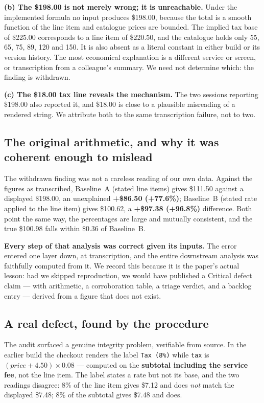 \documentclass[conference]{IEEEtran}
\begin{document}
\textbf{(b) The \$198.00 is not merely wrong; it is unreachable.} Under the implemented formula no
input produces \$198.00, because the total is a smooth function of the line item and catalogue prices
are bounded. The implied tax base of \$225.00 corresponds to a line item of \$220.50, and the catalogue
holds only 55, 65, 75, 89, 120 and 150. It is also absent as a literal constant in either build or its
version history. The most economical explanation is a different service or screen, or transcription
from a colleague's summary. We need not determine which: the finding is withdrawn.

\textbf{(c) The \$18.00 tax line reveals the mechanism.} The two sessions reporting \$198.00 also
reported it, and \$18.00 is close to a plausible misreading of a rendered string. We attribute both to
the same transcription failure, not to two.

\subsection{The original arithmetic, and why it was coherent enough to mislead}

The withdrawn finding was not a careless reading of our own data. Against the figures as transcribed,
Baseline~A (stated line items) gives \$111.50 against a displayed \$198.00, an unexplained
\textbf{+\$86.50 (+77.6\%)}; Baseline~B (stated rate applied to the line item) gives \$100.62, a
\textbf{+\$97.38 (+96.8\%)} difference. Both point the same way, the percentages are large and mutually
consistent, and the true \$100.98 falls within \$0.36 of Baseline~B.

\textbf{Every step of that analysis was correct given its inputs.} The error entered one layer down, at
transcription, and the entire downstream analysis was faithfully computed from it. We record this
because it is the paper's actual lesson: had we skipped reproduction, we would have published a
Critical defect claim --- with arithmetic, a corroboration table, a triage verdict, and a backlog
entry --- derived from a figure that does not exist.

\subsection{A real defect, found by the procedure}

The audit surfaced a genuine integrity problem, verifiable from source. In the earlier build the
checkout renders the label \texttt{Tax (8\%)} while \texttt{tax} is $(price + 4.50) \times 0.08$ ---
computed on the \textbf{subtotal including the service fee}, not the line item. The label states a rate
but not its base, and the two readings disagree: 8\% of the line item gives \$7.12 and does \emph{not}
match the displayed \$7.48; 8\% of the subtotal gives \$7.48 and does.
\end{document}
